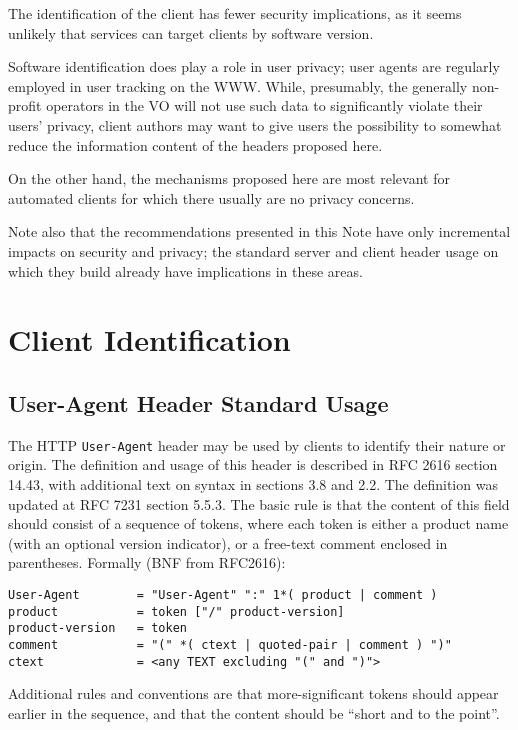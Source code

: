 \documentclass[11pt,a4paper]{ivoa}
\newcommand{\headername}[1]{{\tt #1}}
\begin{document}
The identification of the client has fewer security implications, as it
seems unlikely that services can target clients by software version.

Software identification does play a role in user privacy; user agents
are regularly employed in user tracking on the WWW.  While, presumably,
the generally non-profit operators in the VO will not use such data to
significantly violate their users' privacy, client authors may want to
give users the possibility to somewhat reduce the information content of
the headers proposed here.

On the other hand, the mechanisms proposed here are most relevant for
automated clients for which there usually are no privacy concerns.

Note also that the recommendations presented in this Note
have only incremental impacts on security and privacy;
the standard server and client header usage on which they
build already have implications in these areas.


\section{Client Identification}
\label{sect:client}

\subsection{User-Agent Header Standard Usage}
\label{sect:user-agent}

The HTTP \headername{User-Agent} header may be used by clients
to identify their
nature or origin. The definition and usage of this header is described
in RFC 2616 \citep{std:HTTP} section 14.43, with additional text on
syntax in sections 3.8 and 2.2.
The definition was updated at RFC 7231 section 5.5.3.
The basic rule is that the content of
this field should consist of a sequence of tokens, where each token is
either a product name (with an optional version indicator), or a
free-text comment enclosed in parentheses. Formally (BNF from RFC2616):

\begin{verbatim}
User-Agent        = "User-Agent" ":" 1*( product | comment )
product           = token ["/" product-version]
product-version   = token
comment           = "(" *( ctext | quoted-pair | comment ) ")"
ctext             = <any TEXT excluding "(" and ")">
\end{verbatim}

Additional rules and conventions are that more-significant tokens should
appear earlier in the sequence, and that the content should be ``short
and to the point''.
\end{document}
